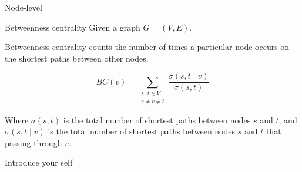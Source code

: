\documentclass[aspectratio=169]{beamer}
\begin{document}
    \begin{frame}{Node-level}
        \begin{exampleblock}{Betweenness centrality}
            Given a graph $G = (V, E)$.
            
            Betweenness centrality counts the number of times a particular node occurs on the shortest paths between other nodes.
        \end{exampleblock}

        \begin{equation}
            BC(v) = \sum_{\substack{s,\, t \in V \\ s \neq v \neq t}} \frac{\sigma(s, t \mid v)}{\sigma(s, t)}
        \end{equation}

        Where $\sigma(s, t)$ is the total number of shortest paths between nodes $s$ and $t$, and $\sigma(s, t \mid v)$ is the total number of shortest paths between nodes $s$ and $t$ that passing through $v$. \newline
        

        \begin{note}
            {Introduce your self}
        \end{note}
    \end{frame}
\end{document}
